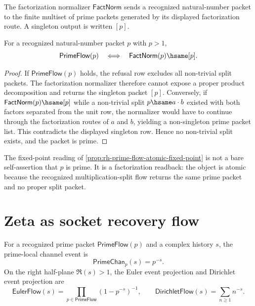 \begin{definition}
\label{def:rh-factorization-normalizer}
The factorization normalizer $\mathsf{FactNorm}$ sends a recognized
natural-number packet to the finite multiset of prime packets generated by
its displayed factorization route.  A singleton output is written $[p]$.
\end{definition}

\begin{proposition}
\label{prop:rh-prime-flow-atomic-fixed-point}
For a recognized natural-number packet $p$ with $p>1$,
$$
\mathsf{PrimeFlow}(p)
\quad\Longleftrightarrow\quad
\mathsf{FactNorm}(p)\hsame [p].
$$
\end{proposition}

\begin{proof}
If $\mathsf{PrimeFlow}(p)$ holds, the refusal row excludes all non-trivial
split packets.  The factorization normalizer therefore cannot expose a
proper product decomposition and returns the singleton packet $[p]$.  Conversely,
if $\mathsf{FactNorm}(p)\hsame[p]$ while a non-trivial split
$p\hsame a\cdot b$ existed with both factors separated from the unit row, the
normalizer would have to continue through the factorization routes of $a$ and
$b$, yielding a non-singleton prime packet list.  This contradicts the
displayed singleton row.  Hence no non-trivial split exists, and the packet is
prime.
\end{proof}

\begin{remark}
\label{rem:rh-prime-flow-no-self-assertion}
The fixed-point reading of \autoref{prop:rh-prime-flow-atomic-fixed-point} is
not a bare self-assertion that $p$ is prime.  It is a factorization readback:
the object is atomic because the recognized multiplication-split flow returns
the same prime packet and no proper split packet.
\end{remark}

\section{Zeta as socket recovery flow}
\label{sec:rh-zeta-socket-recovery-flow}

\begin{definition}
\label{def:rh-prime-local-dirichlet-event-projections}
For a recognized prime packet $\mathsf{PrimeFlow}(p)$ and a complex history
$s$, the prime-local channel event is
$$
\mathsf{PrimeChan}_p(s)=p^{-s}.
$$
On the right half-plane $\Re(s)>1$, the Euler event projection and Dirichlet
event projection are
$$
\mathsf{EulerFlow}(s)=
\prod_{p\in\mathsf{PrimeFlow}}(1-p^{-s})^{-1},
\qquad
\mathsf{DirichletFlow}(s)=\sum_{n\geq 1}n^{-s}.
$$
\end{definition}

